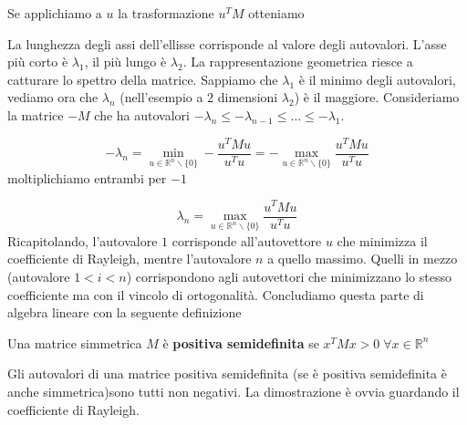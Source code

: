 \documentclass[12pt]{report}
\begin{document}
Se applichiamo a $u$ la trasformazione $u^TM$ otteniamo

\begin{center}
\end{center}

\noindent
La lunghezza degli assi dell'ellisse corrisponde al valore degli autovalori. L'asse più corto è $\lambda_1$, il più lungo è $\lambda_2$. La rappresentazione geometrica riesce a catturare lo spettro della matrice. Sappiamo che $\lambda_1$ è il minimo degli autovalori, vediamo ora che $\lambda_n$ (nell'esempio a $2$ dimensioni $\lambda_2$) è il maggiore.
Consideriamo la matrice $-M$ che ha autovalori $-\lambda_n \leq -\lambda_{n-1} \leq \dots \leq -\lambda_1$.

$$-\lambda_n =  \min_{u \in \mathbb{R}^n\backslash\{0\}} -\frac{u^TMu}{u^Tu}= - \max_{u \in \mathbb{R}^n\backslash\{0\}}\frac{u^TMu}{u^Tu} $$
moltiplichiamo entrambi per $-1$

$$\lambda_n =  \max_{u \in \mathbb{R}^n\backslash\{0\}}\frac{u^TMu}{u^Tu} $$
Ricapitolando, l'autovalore $1$ corrisponde all'autovettore $u$ che minimizza il coefficiente di Rayleigh, mentre l'autovalore $n$ a quello massimo. Quelli in mezzo (autovalore $1 < i < n$) corrispondono agli autovettori che minimizzano lo stesso coefficiente ma con il vincolo di ortogonalità. Concludiamo questa parte di algebra lineare con la seguente definizione

\begin{defi}
    Una matrice simmetrica $M$ è \textbf{positiva semidefinita} se $x^TMx > 0 \; \forall x \in \mathbb{R}^n $
\end{defi}

\noindent 
Gli autovalori di una matrice positiva semidefinita (se è positiva semidefinita è anche simmetrica)sono tutti non negativi. La dimostrazione è ovvia guardando il coefficiente di Rayleigh.  
\end{document}
